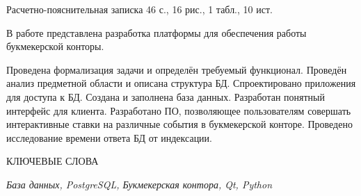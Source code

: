 
Расчетно-пояснительная записка 46 с., 16 рис., 1 табл., 10 ист.

В работе представлена разработка платформы для обеспечения работы букмекерской конторы.

Проведена формализация задачи и определён требуемый функционал. Проведён анализ предметной области и описана структура БД. 
Спроектировано приложения для доступа к БД. Создана и заполнена база данных. Разработан понятный интерфейс для клиента. 
Разработано ПО, позволяющее пользователям совершать интерактивные ставки на различные события в букмекерской конторе.
Проведено исследование времени ответа БД от индексации.

КЛЮЧЕВЫЕ СЛОВА

\textit{База данных, PostgreSQL, Букмекерская контора, Qt, Python}

\pagebreak